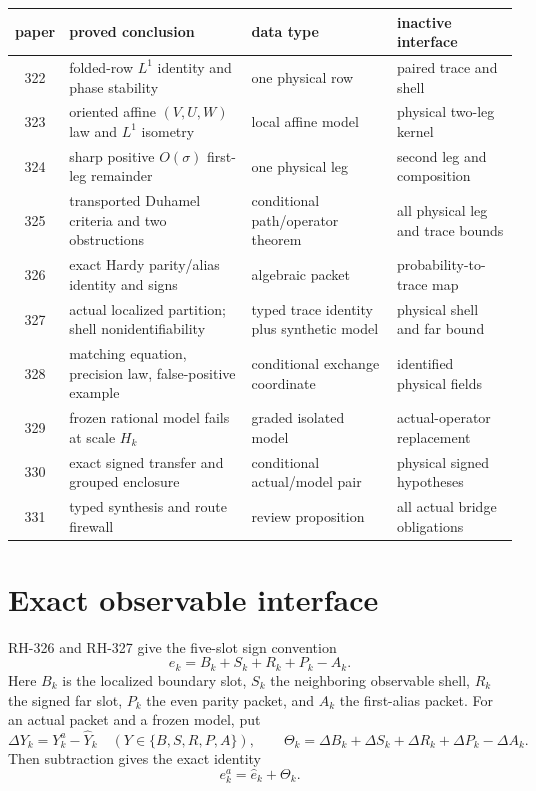 \documentclass[11pt]{article}
\theoremstyle{remark}\newtheorem{remark}[theorem]{Remark}
\newcommand{\Hk}{H_k}
\begin{document}
\begin{center}\small
\begin{tabularx}{\textwidth}{@{}c>{\raggedright\arraybackslash}p{}>{\raggedright\arraybackslash}X>{\raggedright\arraybackslash}p{}@{}}
\toprule
paper & proved conclusion & data type & inactive interface\\\midrule
322 & folded-row $L^1$ identity and phase stability & one physical row & paired trace and shell\\
323 & oriented affine $(V,U,W)$ law and $L^1$ isometry & local affine model & physical two-leg kernel\\
324 & sharp positive $O(\sigma)$ first-leg remainder & one physical leg & second leg and composition\\
325 & transported Duhamel criteria and two obstructions & conditional path/operator theorem & all physical leg and trace bounds\\
326 & exact Hardy parity/alias identity and signs & algebraic packet & probability-to-trace map\\
327 & actual localized partition; shell nonidentifiability & typed trace identity plus synthetic model & physical shell and far bound\\
328 & matching equation, precision law, false-positive example & conditional exchange coordinate & identified physical fields\\
329 & frozen rational model fails at scale $\Hk$ & graded isolated model & actual-operator replacement\\
330 & exact signed transfer and grouped enclosure & conditional actual/model pair & physical signed hypotheses\\
331 & typed synthesis and route firewall & review proposition & all actual bridge obligations\\
\bottomrule
\end{tabularx}
\end{center}

\section{Exact observable interface}
RH-326 and RH-327 give the five-slot sign convention
\[
 e_k=B_k+S_k+R_k+P_k-A_k.                                      \tag{1}
\]
Here $B_k$ is the localized boundary slot, $S_k$ the neighboring observable
shell, $R_k$ the signed far slot, $P_k$ the even parity packet, and $A_k$ the
first-alias packet.  For an actual packet and a frozen model, put
\[
 \Delta Y_k=Y_k^a-\widehat Y_k\quad(Y\in\{B,S,R,P,A\}),\qquad
 \Theta_k=\Delta B_k+\Delta S_k+\Delta R_k+\Delta P_k-\Delta A_k. \tag{2}
\]
Then subtraction gives the exact identity
\[
 e_k^a=\widehat e_k+\Theta_k.                                  \tag{3}
\]
\end{document}
